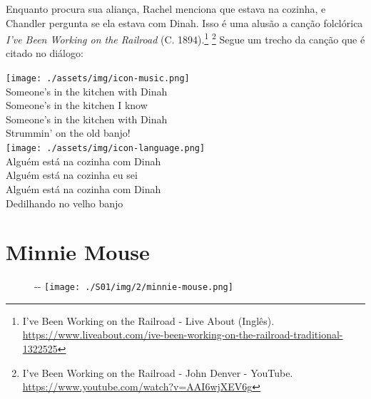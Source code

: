 Enquanto procura sua aliança, Rachel menciona que estava na cozinha, e
Chandler pergunta se ela estava com Dinah. Isso é uma alusão a canção
folclórica \emph{I've Been Working on the Railroad} (C.
1894).\footnote{\sloppy I’ve Been Working on the Railroad - Live About (Inglês). \url{https://www.liveabout.com/ive-been-working-on-the-railroad-traditional-1322525}}
\footnote{\sloppy I’ve Been Working on the Railroad - John Denver - YouTube. \url{https://www.youtube.com/watch?v=AAI6wjXEV6g}}
Segue um trecho da canção que é citado no diálogo:

\bigskip
\begin{tcolorbox}[enhanced,
    drop fuzzy shadow southeast, boxrule=0.3pt,
    lower separated=false, sidebyside, sidebyside align=top,
    halign=flush right, halign lower=left, breakable,
    colframe=black!30!dialogoBorder,colback=musicaBg]
\texttt{[image: ./assets/img/icon-music.png]}\\
Someone’s in the kitchen with Dinah\\Someone’s in the kitchen I know\\Someone’s in the kitchen with Dinah\\Strummin’ on the old banjo!\\
\tcblower
\texttt{[image: ./assets/img/icon-language.png]}\\
Alguém está na cozinha com Dinah\\Alguém está na cozinha eu sei\\Alguém está na cozinha com Dinah\\Dedilhando no velho banjo\\
\end{tcolorbox}

\hypertarget{minnie-mouse}{%
\section{Minnie Mouse}\label{minnie-mouse}}

\begin{figure}[!ht]
  \begin{adjustwidth}{-\oddsidemargin-1in}{-\rightmargin}
    \centering
    \texttt{[image: ./S01/img/2/minnie-mouse.png]}
  \end{adjustwidth}
\end{figure}

